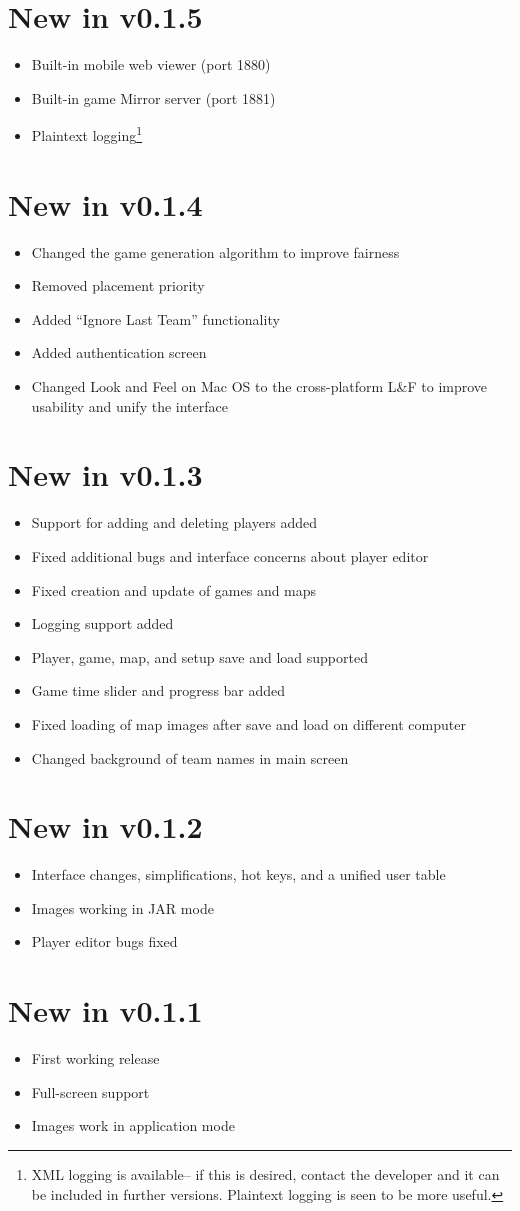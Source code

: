 \documentclass[pdftex,10pt,a4paper]{report}
\begin{document}
\section{New in v0.1.5}
\begin{itemize}
\item Built-in mobile web viewer (port 1880)
\item Built-in game Mirror server (port 1881)
\item Plaintext logging\footnote{XML logging is available-- if this is desired, contact the developer and it can be included in further versions.  Plaintext logging is seen to be more useful.}
\end{itemize}
\section{New in v0.1.4}
\begin{itemize}
\item Changed the game generation algorithm to improve fairness
\item Removed placement priority
\item Added ``Ignore Last Team'' functionality
\item Added authentication screen
\item Changed Look and Feel on Mac OS to the cross-platform L\&F to improve usability and unify the interface
\end{itemize}
\section{New in v0.1.3}
\begin{itemize}
\item Support for adding and deleting players added
\item Fixed additional bugs and interface concerns about player editor
\item Fixed creation and update of games and maps
\item Logging support added
\item Player, game, map, and setup save and load supported
\item Game time slider and progress bar added
\item Fixed loading of map images after save and load on different computer
\item Changed background of team names in main screen
\end{itemize}
\section{New in v0.1.2}
\begin{itemize}
\item Interface changes, simplifications, hot keys, and a unified user table
\item Images working in JAR mode
\item Player editor bugs fixed
\end{itemize}
\section{New in v0.1.1}
\begin{itemize}
\item First working release
\item Full-screen support
\item Images work in application mode
\end{itemize}
\end{document}
